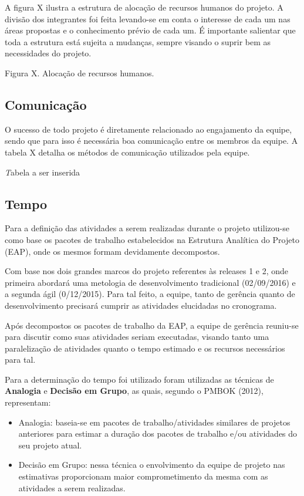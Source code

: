 A figura X ilustra a estrutura de alocação de recursos humanos do projeto. A divisão dos integrantes foi feita levando-se em conta o interesse de cada um nas áreas propostas e o conhecimento prévio de cada um. É importante salientar que toda a estrutura está sujeita a mudanças, sempre visando o suprir bem as necessidades do projeto.

Figura X. Alocação de recursos humanos.

\subsection{Comunicação}

O sucesso de todo projeto é diretamente relacionado ao engajamento da equipe, sendo que para isso é necessária boa comunicação entre os membros da equipe. A tabela X detalha os métodos de comunicação utilizados pela equipe.

\textit Tabela a ser inserida

\subsection{Tempo}

Para a definição das atividades a serem realizadas durante o projeto utilizou-se como base os pacotes de trabalho estabelecidos na Estrutura Analítica do Projeto (EAP), onde os mesmos formam devidamente decompostos.

Com base nos dois grandes marcos do projeto referentes às releases 1 e 2, onde primeira abordará uma metologia de desenvolvimento tradicional (02/09/2016) e a segunda ágil (0/12/2015). Para tal feito, a equipe, tanto de gerência quanto de desenvolvimento precisará cumprir as atividades elucidadas no cronograma.

Após decompostos os pacotes de trabalho da EAP, a equipe de gerência reuniu-se para discutir como suas atividades seriam executadas, visando tanto uma paralelização de atividades quanto o tempo estimado e os recursos necessários para tal.

Para a determinação do tempo foi utilizado foram utilizadas as técnicas de \textbf{Analogia} e \textbf{Decisão em Grupo}, as quais, segundo o PMBOK (2012), representam:

\begin{itemize}
	\item Analogia: baseia-se em pacotes de trabalho/atividades similares de projetos anteriores para estimar a duração dos pacotes de trabalho e/ou atividades do seu projeto atual.
	\item Decisão em Grupo: nessa técnica o envolvimento da equipe de projeto nas estimativas proporcionam maior comprometimento da mesma com as atividades a serem realizadas.
\end{itemize}

